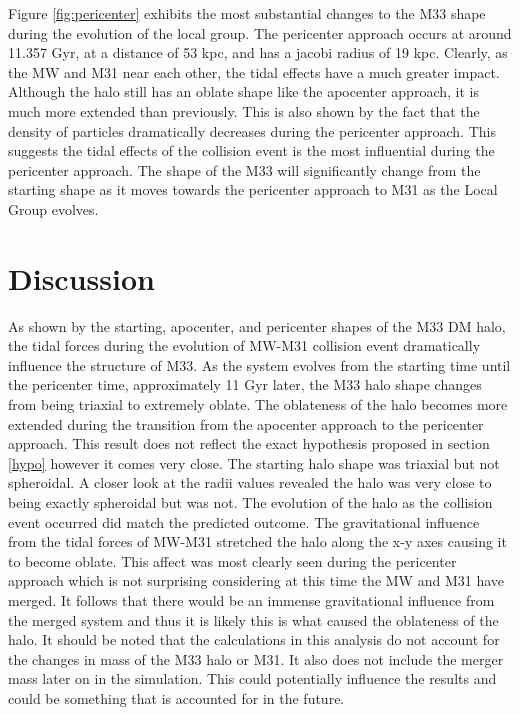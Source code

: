 \documentclass[usenatbib]{mnras}
\begin{document}
Figure \ref{fig:pericenter} exhibits the most substantial changes to the M33 shape during the evolution of the local group. The pericenter approach occurs at around 11.357 Gyr, at a distance of 53 kpc, and has a jacobi radius of 19 kpc. Clearly, as the MW and M31 near each other, the tidal effects have a much greater impact. Although the halo still has an oblate shape like the apocenter approach, it is much more extended than previously. This is also shown by the fact that the density of particles dramatically decreases during the pericenter approach. This suggests the tidal effects of the collision event is the most influential during the pericenter approach. The shape of the M33 will significantly change from the starting shape as it moves towards the pericenter approach to M31 as the Local Group evolves.  

\section{Discussion}
As shown by the starting, apocenter, and pericenter shapes of the M33 DM halo, the tidal forces during the evolution of MW-M31 collision event dramatically influence the structure of M33. As the system evolves from the starting time until the pericenter time, approximately 11 Gyr later, the M33 halo shape changes from being triaxial to extremely oblate. The oblateness of the halo becomes more extended during the transition from the apocenter approach to the pericenter approach. This result does not reflect the exact hypothesis proposed in section \ref{hypo} however it comes very close. The starting halo shape was triaxial but not spheroidal. A closer look at the radii values revealed the halo was very close to being exactly spheroidal but was not. The evolution of the halo as the collision event occurred did match the predicted outcome. The gravitational influence from the tidal forces of MW-M31 stretched the halo along the x-y axes causing it to become oblate. This affect was most clearly seen during the pericenter approach which is not surprising considering at this time the MW and M31 have merged. It follows that there would be an immense gravitational influence from the merged system and thus it is likely this is what caused the oblateness of the halo. It should be noted that the calculations in this analysis do not account for the changes in mass of the M33 halo or M31. It also does not include the merger mass later on in the simulation. This could potentially influence the results and could be something that is accounted for in the future.  
\end{document}
